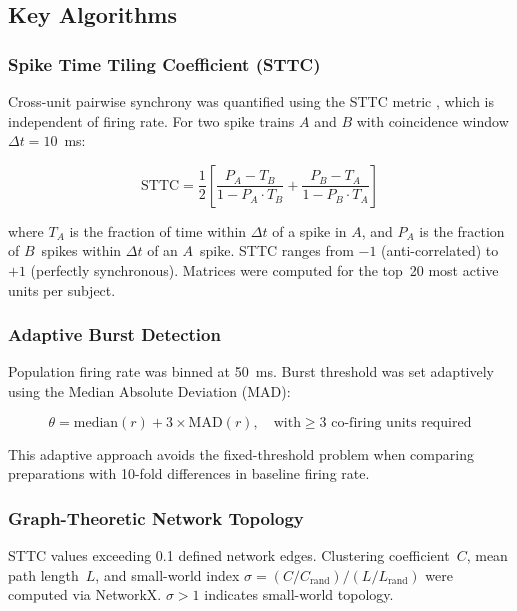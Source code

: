 \documentclass[11pt,a4paper]{article}
\begin{document}
\subsection{Key Algorithms}

\subsubsection{Spike Time Tiling Coefficient (STTC)}

Cross-unit pairwise synchrony was quantified using the STTC metric 
\citep{cutts2014}, which is independent of firing rate. For two spike trains 
$A$ and $B$ with coincidence window $\Delta t = 10$~ms:

\begin{equation}
\text{STTC} = \frac{1}{2}\left[\frac{P_A - T_B}{1 - P_A \cdot T_B} + 
\frac{P_B - T_A}{1 - P_B \cdot T_A}\right]
\end{equation}

\noindent where $T_A$ is the fraction of time within $\Delta t$ of a spike in $A$, 
and $P_A$ is the fraction of $B$~spikes within $\Delta t$ of an $A$~spike. STTC 
ranges from $-1$ (anti-correlated) to $+1$ (perfectly synchronous). Matrices were 
computed for the top~20 most active units per subject.

\subsubsection{Adaptive Burst Detection}

Population firing rate was binned at 50~ms. Burst threshold was set adaptively 
using the Median Absolute Deviation (MAD):

\begin{equation}
\theta = \text{median}(r) + 3 \times \text{MAD}(r), \quad 
\text{with} \geq 3 \text{ co-firing units required}
\end{equation}

\noindent This adaptive approach avoids the fixed-threshold problem when comparing 
preparations with 10-fold differences in baseline firing rate.

\subsubsection{Graph-Theoretic Network Topology}

STTC values exceeding 0.1 defined network edges. Clustering coefficient~$C$, mean 
path length~$L$, and small-world index $\sigma = (C/C_{\text{rand}})/(L/L_{\text{rand}})$ 
were computed via NetworkX. $\sigma > 1$ indicates small-world topology.
\end{document}
